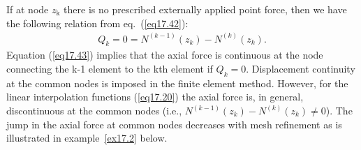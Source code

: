 \documentclass{AeroStructure-ERJohnson}
\begin{document}
If at node $z_{\textrm{k}}$ there is no prescribed externally applied point force, then we have the following relation from eq.~(\ref{eq17.42}):\vspace*{-12pt}
\begin{align}
Q_{k}=0=N^{(k-1)}\left(z_{k}\right)-N^{(k)}\left(z_{k}\right). \label{eq17.43}
\end{align}
Equation (\ref{eq17.43}) implies that the axial force is continuous at the node connecting the k-1 element to the kth element if $Q_{k}=0$. Displacement continuity at the common nodes is imposed in the finite element method. However, for the linear interpolation functions (\ref{eq17.20}) the axial force is, in general, discontinuous at the common nodes (i.e., $N^{(k-1)}\left(z_{k}\right)-N^{(k)}\left(z_{k}\right) \neq 0$). The jump in the axial force at common nodes decreases with mesh refinement as is illustrated in example~\ref{ex17.2} below.

\pagebreak
\end{document}

